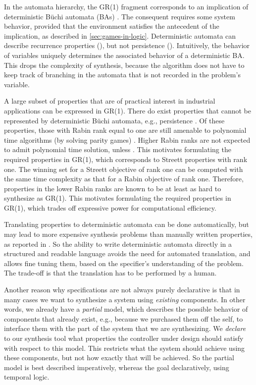 \documentclass[copyright]{eptcs}
\begin{document}
In the automata hierarchy, the GR(1) fragment corresponds to an implication of deterministic B\"{u}chi automata (BAs) \cite{Piterman06,Schneider04,Morgenstern11wigp,Sohail08vmcai}.
The consequent requires some system behavior, provided that the environment satisfies the antecedent of the implication, as described in \cref{sec:games-in-logic}.
Deterministic automata can describe recurrence properties (), but not persistence ().
Intuitively, the behavior of variables uniquely determines the associated behavior of a deterministic BA.
This drops the complexity of synthesis, because the algorithm does not have to keep track of branching in the automata that is not recorded in the problem's variable.

A large subset of properties that are of practical interest in industrial applications \cite{Dwyer99icse,Manna90stanford-tr,Bloem12jcss} can be expressed in GR(1).
There do exist properties that cannot be represented by deterministic B\"{u}chi automata, e.g., persistence .
Of these properties, those with Rabin rank equal to one are still amenable to polynomial time algorithms (by solving parity games) \cite{Ehlers11nfm}.
Higher Rabin ranks are not expected to admit polynomial time solution, unless  \cite{Ehlers11nfm}.
This motivates formulating the required properties in GR(1), which corresponds to Streett properties with rank one.
The winning set for a Streett objective of rank one can be computed with the same time complexity as that for a Rabin objective of rank one.
Therefore, properties in the lower Rabin ranks are known to be at least as hard to synthesize as GR(1).
This motivates formulating the required properties in GR(1), which trades off expressive power for computational efficiency.

Translating properties to deterministic automata can be done automatically, but may lead to more expensive synthesis problems than manually written properties, as reported in \cite{Morgenstern11wigp}.
So the ability to write deterministic automata directly in a structured and readable language avoids the need for automated translation, and allows fine tuning them, based on the specifier's understanding of the problem.
The trade-off is that the translation has to be performed by a human.

Another reason why specifications are not always purely declarative is that in many cases we want to synthesize a system using {\em existing} components.
In other words, we already have a {\em partial} model, which describes the possible behavior of components that already exist, e.g., because we purchased them off the self, to interface them with the part of the system that we are synthesizing.
We {\em declare} to our synthesis tool what properties the controller under design should satisfy with respect to this model.
This restricts what the system should achieve using these components, but not how exactly that will be achieved.
So the partial model is best described imperatively, whereas the goal declaratively, using temporal logic.
\end{document}

